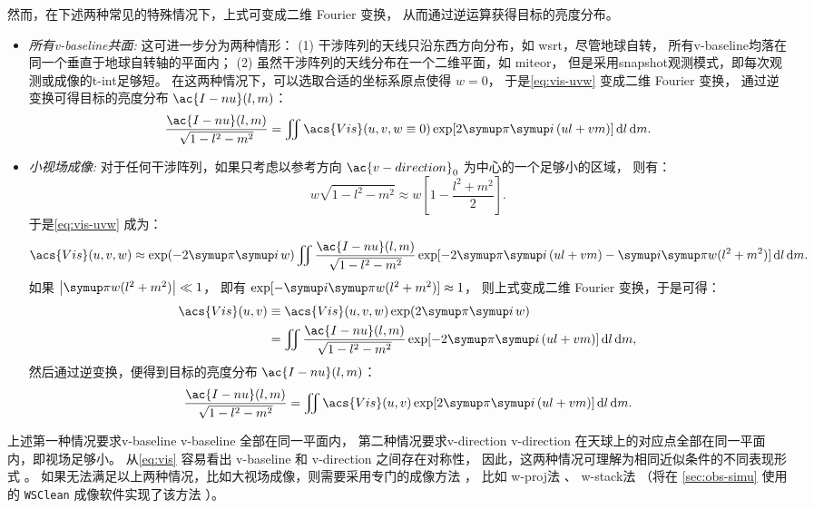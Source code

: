 然而，在下述两种常见的特殊情况下，上式可变成二维 Fourier 变换，
从而通过逆运算获得目标的亮度分布。
\begin{itemize}
\item
\emph{所有\acl{v-baseline}共面:}
这可进一步分为两种情形：
(1) 干涉阵列的天线只沿东西方向分布，如 \ac{wsrt}，尽管地球自转，
所有\acl{v-baseline}均落在同一个垂直于地球自转轴的平面内；
(2) 虽然干涉阵列的天线分布在一个二维平面，如 \ac{miteor}，
但是采用\ac{snapshot}观测模式，即每次观测或成像的\ac{t-int}足够短。
在这两种情况下，可以选取合适的坐标系原点使得 $w = 0$，
于是\autoref{eq:vis-uvw} 变成二维 Fourier 变换，
通过逆变换可得目标的亮度分布 $\ac{I-nu}(l,m)$：
\begin{equation}
  \label{eq:vis-inv1}
  \frac{\ac{I-nu}(l,m)}{\sqrt{1-l^2-m^2}}
    = \iint \acs{Vis}(u,v, w \equiv 0)
      \exp [2\Cpi\Ci\, (ul+vm)] \,\D{l}\,\D{m} .
\end{equation}

\item
\emph{小视场成像:}
对于任何干涉阵列，如果只考虑以参考方向 $\ac{v-direction}_0$ 为中心的一个足够小的区域，
则有：
\begin{equation}
  w \sqrt{1-l^2-m^2}
    \approx w \left[ 1 - \frac{l^2+m^2}{2} \right] .
\end{equation}
于是\autoref{eq:vis-uvw} 成为：
\begin{equation}
  \acs{Vis}(u,v,w) \approx \exp (-2\Cpi\Ci\,w) \iint
    \frac{\ac{I-nu}(l,m)}{\sqrt{1-l^2-m^2}}
    \exp [-2\Cpi\Ci\, (ul+vm) -\Ci\Cpi w(l^2+m^2)] \,\D{l}\,\D{m} .
\end{equation}
如果 $\big| \Cpi w(l^2+m^2) \big| \ll 1$，
即有 $\exp [-\Ci\Cpi w(l^2+m^2)] \approx 1$，
则上式变成二维 Fourier 变换，于是可得：
\begin{align}
  \acs{Vis}(u,v)
    & \equiv \acs{Vis}(u,v,w) \exp (2\Cpi\Ci\,w)  \\
    & = \iint \frac{\ac{I-nu}(l,m)}{\sqrt{1-l^2-m^2}}
    \exp [-2\Cpi\Ci\, (ul+vm)] \,\D{l}\,\D{m} ,
  \label{eq:vis-uv}
\end{align}
然后通过逆变换，便得到目标的亮度分布 $\ac{I-nu}(l,m)$：
\begin{equation}
  \label{eq:vis-inv2}
  \frac{\ac{I-nu}(l,m)}{\sqrt{1-l^2-m^2}}
    = \iint \acs{Vis}(u,v)
      \exp [2\Cpi\Ci\, (ul+vm)] \,\D{l}\,\D{m} .
\end{equation}

\end{itemize}

上述第一种情况要求\acl{v-baseline} \ac{v-baseline} 全部在同一平面内，
第二种情况要求\acl{v-direction} \ac{v-direction}
在天球上的对应点全部在同一平面内，即视场足够小。
从\autoref{eq:vis} 容易看出 \ac{v-baseline} 和 \ac{v-direction} 之间存在对称性，
因此，这两种情况可理解为相同近似条件的不同表现形式 \cite{clark1999}。
如果无法满足以上两种情况，比如大视场成像，则需要采用专门的成像方法
\cite{cornwell1992,sault2007}，
比如 \ac{w-proj}法 \cite{cornwell2008}、
\ac{w-stack}法 \cite{humphreys2011}
（将在 \autoref{sec:obs-simu} 使用的 \texttt{WSClean} 成像软件实现了该方法
\cite{offringa2014,offringa2017}）。

